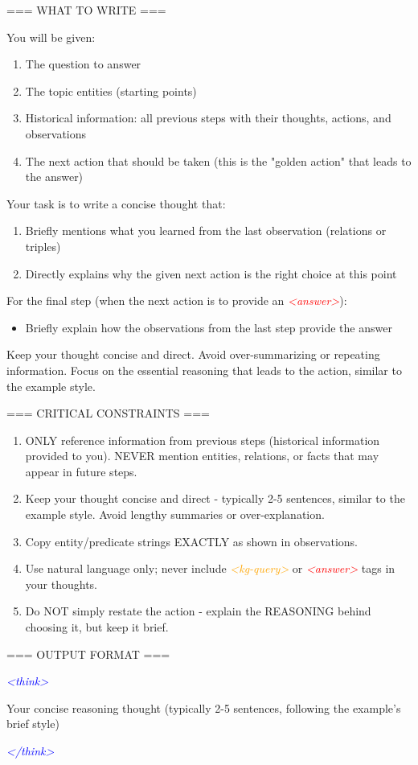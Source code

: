 \begin{tcolorbox}
=== WHAT TO WRITE ===

You will be given:
\begin{enumerate}
  \item The question to answer
  \item The topic entities (starting points)
  \item Historical information: all previous steps with their thoughts, actions, and observations
  \item The next action that should be taken (this is the "golden action" that leads to the answer)
\end{enumerate}

Your task is to write a concise thought that:
\begin{enumerate}
  \item Briefly mentions what you learned from the last observation (relations or triples)
  \item Directly explains why the given next action is the right choice at this point
\end{enumerate}

For the final step (when the next action is to provide an \textcolor{red}{\textit{<answer>}}):
\begin{itemize}
  \item Briefly explain how the observations from the last step provide the answer
\end{itemize}

Keep your thought concise and direct. Avoid over-summarizing or repeating information. Focus on the essential reasoning that leads to the action, similar to the example style.

=== CRITICAL CONSTRAINTS ===
\begin{enumerate}
  \item ONLY reference information from previous steps (historical information provided to you). NEVER mention entities, relations, or facts that may appear in future steps.
  \item Keep your thought concise and direct - typically 2-5 sentences, similar to the example style. Avoid lengthy summaries or over-explanation.
  \item Copy entity/predicate strings EXACTLY as shown in observations.
  \item Use natural language only; never include \textcolor{orange}{\textit{<kg-query>}} or \textcolor{red}{\textit{<answer>}} tags in your thoughts.
  \item Do NOT simply restate the action - explain the REASONING behind choosing it, but keep it brief.
\end{enumerate}

=== OUTPUT FORMAT ===

\textcolor{blue}{\textit{<think>}}

Your concise reasoning thought (typically 2-5 sentences, following the example's brief style)

\textcolor{blue}{\textit{</think>}}
\end{tcolorbox}

